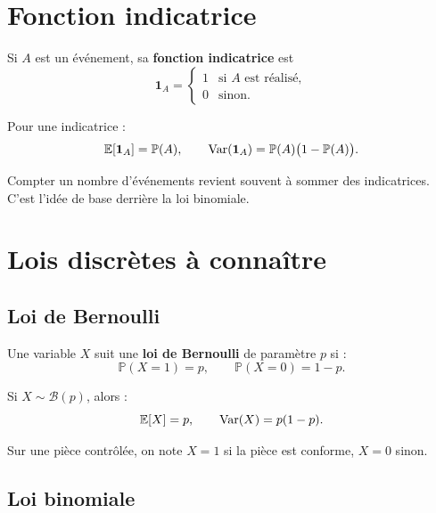 \section{Fonction indicatrice}

\begin{Def}
Si $A$ est un événement, sa \textbf{fonction indicatrice} est
$$
\mathbf{1}_A=
\begin{cases}
1 & \text{si } A \text{ est réalisé},\\
0 & \text{sinon}.
\end{cases}
$$
\end{Def}

\begin{Prop}
Pour une indicatrice :
$$
\mathbb{E}[\mathbf{1}_A]=\mathbb{P}(A), \qquad
\operatorname{Var}(\mathbf{1}_A)=\mathbb{P}(A)\bigl(1-\mathbb{P}(A)\bigr).
$$
\end{Prop}

\begin{Rmq}
Compter un nombre d'événements revient souvent à sommer des indicatrices. C'est l'idée de base derrière la loi binomiale.
\end{Rmq}

\section{Lois discrètes à connaître}

\subsection{Loi de Bernoulli}

\begin{Def}
Une variable $X$ suit une \textbf{loi de Bernoulli} de paramètre $p$ si :
$$
\mathbb{P}(X=1)=p, \qquad \mathbb{P}(X=0)=1-p.
$$
\end{Def}

\begin{Prop}
Si $X\sim \mathcal{B}(p)$, alors :
$$
\mathbb{E}[X]=p, \qquad \operatorname{Var}(X)=p(1-p).
$$
\end{Prop}

\begin{Ex}
Sur une pièce contrôlée, on note $X=1$ si la pièce est conforme, $X=0$ sinon.
\end{Ex}

\subsection{Loi binomiale}


